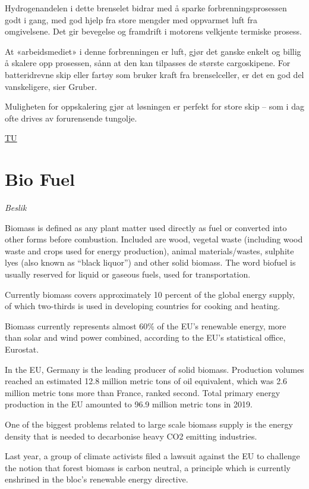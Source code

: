 \documentclass[
]{book}
\begin{document}
Hydrogenandelen i dette brenselet bidrar med å sparke forbrenningsprosessen godt i gang, med god hjelp fra store mengder med oppvarmet luft fra omgivelsene. Det gir bevegelse og framdrift i motorens velkjente termiske prosess.

At «arbeidsmediet» i denne forbrenningen er luft, gjør det ganske enkelt og billig å skalere opp prosessen, sånn at den kan tilpasses de største cargoskipene. For batteridrevne skip eller fartøy som bruker kraft fra brenselceller, er det en god del vanskeligere, sier Gruber.

Muligheten for oppskalering gjør at løsningen er perfekt for store skip -- som i dag ofte drives av forurensende tungolje.

\href{https://www.tu.no/artikler/ammoniakk-kan-gjore-langdistanse-skipsfart-helgronn/511245}{TU}

\hypertarget{bio-fuel}{%
\chapter{Bio Fuel}\label{bio-fuel}}

\emph{Beslik}

Biomass is defined as any plant matter used directly as fuel or converted into other forms before combustion. Included are wood, vegetal waste (including wood waste and crops used for energy production), animal materials/wastes, sulphite lyes (also known as ``black liquor'') and other solid biomass. The word biofuel is usually reserved for liquid or gaseous fuels, used for transportation.

Currently biomass covers approximately 10 percent of the global energy supply, of which two-thirds is used in developing countries for cooking and heating.

Biomass currently represents almost 60\% of the EU's renewable energy, more than solar and wind power combined, according to the EU's statistical office, Eurostat.

In the EU, Germany is the leading producer of solid biomass. Production volumes reached an estimated 12.8 million metric tons of oil equivalent, which was 2.6 million metric tons more than France, ranked second. Total primary energy production in the EU amounted to 96.9 million metric tons in 2019.

One of the biggest problems related to large scale biomass supply is the energy density that is needed to decarbonise heavy CO2 emitting industries.

Last year, a group of climate activists filed a lawsuit against the EU to challenge the notion that forest biomass is carbon neutral, a principle which is currently enshrined in the bloc's renewable energy directive.
\end{document}
